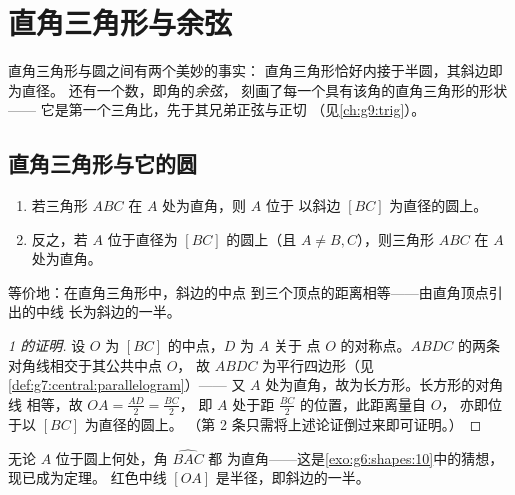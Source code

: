 \chapter{直角三角形与余弦}\label{ch:g8:cosine}

直角三角形与圆之间有两个美妙的事实：
直角三角形恰好内接于半圆，其斜边即为直径。
还有一个数，即角的\emph{余弦}，
刻画了每一个具有该角的直角三角形的形状——
它是第一个三角比，先于其兄弟正弦与正切
（见\cref{ch:g9:trig}）。

\section{直角三角形与它的圆}

\begin{theorem}[圆定理]\label{thm:g8:cosine:circle}
\begin{enumerate}
  \item 若三角形 $ABC$ 在 $A$ 处为直角，则 $A$ 位于
        以斜边 $[BC]$ 为直径的圆上。
  \item 反之，若 $A$ 位于直径为 $[BC]$ 的圆上（且
        $A \neq B, C$），则三角形 $ABC$ 在
        $A$ 处为直角。
\end{enumerate}
等价地：在直角三角形中，斜边的中点
到三个顶点的距离相等——由直角顶点引出的中线
长为斜边的一半。
\end{theorem}

\begin{proof}[1 的证明]
设 $O$ 为 $[BC]$ 的中点，$D$ 为 $A$ 关于
点 $O$ 的对称点。$ABDC$ 的两条对角线相交于其公共中点 $O$，
故 $ABDC$ 为平行四边形（见\cref{def:g7:central:parallelogram}）——
又 $A$ 处为直角，故为长方形。长方形的对角线
相等，故 $OA = \frac{AD}{2} = \frac{BC}{2}$，
即 $A$ 处于距 $\frac{BC}{2}$ 的位置，此距离量自 $O$，
亦即位于以 $[BC]$ 为直径的圆上。
（第 2 条只需将上述论证倒过来即可证明。）
\end{proof}

\begin{omfigure}

{\small 无论 $A$ 位于圆上何处，角 $\widehat{BAC}$ 都
为直角——这是\cref{exo:g6:shapes:10}中的猜想，现已成为定理。
红色中线 $[OA]$ 是半径，即斜边的一半。}
\end{omfigure}


